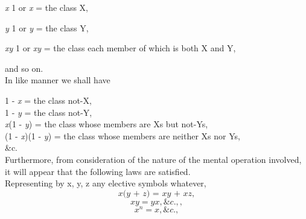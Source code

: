\documentclass{article}
\begin{document}
{\hspace{.4in}
		\textit x 1 or \textit x  =  the class X,\vspace{.05in}

\hspace{.4in}
		\textit y 1 or \textit y = the class Y,\vspace{.05in}

\hspace{.4in}
       		\textit{xy} 1 or \textit{xy} = the class each member of which is both X and Y,\vspace{.1in}

and so on.\\
\hspace{.2in}In like manner we shall have\vspace{.1in}

              \hspace{.6in} 1 - \textit x    =   the class  not-X,\\ \vspace{.005in}
               \hspace{.8in}1 - \textit y   =   the class  not-Y,\\ \vspace{.005in}
            \hspace{.6in}\textit x(1 - \textit y)  =   the class  whose members are Xs but not-Ys,\\ \vspace{.005in}
     \hspace{.6in}(1 - \textit x)(1 - \textit y)   =   the class  whose members are neither Xs nor Ys,\\ \vspace{.005in}
                  \hspace{.8in} \&c.\\ \vspace{.005in}
  \hspace{.2in}Furthermore, from consideration of the nature of the mental operation involved, it will appear that the following laws are satisfied.\\
 \hspace{.2in}  Representing by x, y, z any elective symbols whatever,
\begin{equation}\textit{x(y + z) = xy + xz},\end{equation}
\begin{equation}\textit{$xy = yx, \&c.,$},\end{equation}
\begin{equation}\textit{$x^n = x, \&c.$},\end{equation}
}
\end{document}
